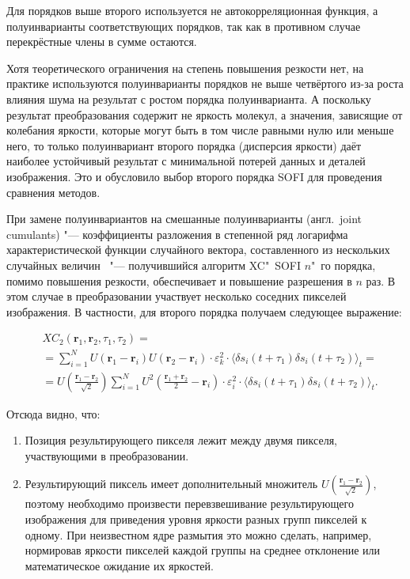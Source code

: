 Для порядков выше второго используется не автокорреляционная функция, а полуинварианты соответствующих порядков, так как в противном случае перекрёстные члены в сумме остаются.

Хотя теоретического ограничения на степень повышения резкости нет, на практике используются полуинварианты порядков не выше четвёртого из-за роста влияния шума на результат с ростом порядка полуинварианта. А поскольку результат преобразования содержит не яркость молекул, а значения, зависящие от колебания яркости, которые могут быть в том числе равными нулю или меньше него, то только полуинвариант второго порядка (дисперсия яркости) даёт наиболее устойчивый результат с минимальной потерей данных и деталей изображения. Это и обусловило выбор второго порядка SOFI для проведения сравнения методов.

При замене полуинвариантов на смешанные полуинварианты (англ.~joint cumulants) "--- коэффициенты разложения в степенной ряд логарифма характеристической функции случайного вектора, составленного из нескольких случайных величин~\cite{малахов1978кумулянтный} "--- получившийся алгоритм XC"~SOFI $n$"~го порядка, помимо повышения резкости, обеспечивает и повышение разрешения в $n$ раз. В этом случае в преобразовании участвует несколько соседних пикселей изображения. В частности, для второго порядка получаем следующее выражение:

\begin{align*}
	&{XC}_2\left(\mathbf{r}_1,\mathbf{r}_2,\tau_1,\tau_2\right) = \\
	&= \sum_{i=1}^{N} {U\left(\mathbf{r}_1-\mathbf{r}_i\right)U\left(\mathbf{r}_2-\mathbf{r}_i\right)\cdot\varepsilon_k^2\cdot \langle \delta s_i\left(t+\tau_1\right)\delta s_i\left(t+\tau_2\right) \rangle_t} = \\
	&= U\left(\frac{\mathbf{r}_1-\mathbf{r}_2}{\sqrt2}\right) \sum_{i=1}^{N} {U^2\left(\frac{\mathbf{r}_1+\mathbf{r}_2}{2}-\mathbf{r}_i\right)\cdot\varepsilon_i^2\cdot \langle \delta s_i\left(t+\tau_1\right)\delta s_i\left(t+\tau_2\right) \rangle_t}.
\end{align*}

Отсюда видно, что:

\begin{enumerate}[beginpenalty=10000]
	\item Позиция результирующего пикселя лежит между двумя пикселя, участвующими в преобразовании.
	\item Результирующий пиксель имеет дополнительный множитель $U\left(\frac{\mathbf{r}_1-\mathbf{r}_2}{\sqrt2}\right)$, поэтому необходимо произвести перевзвешивание результирующего изображения для приведения уровня яркости разных групп пикселей к одному. При неизвестном ядре размытия это можно сделать, например, нормировав яркости пикселей каждой группы на среднее отклонение или математическое ожидание их яркостей.
\end{enumerate}

